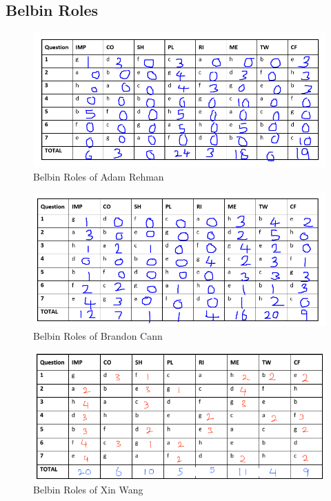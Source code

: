 \documentclass[12pt,a4paper]{article}
\begin{document}
\subsection{Belbin Roles}
\begin{figure} [h!]
	\centering
	\includegraphics[scale=0.5]{Adam.PNG}
	\caption{Belbin Roles of Adam Rehman}
\end{figure}
\begin{figure} [h!]
	\centering
	\includegraphics[scale=0.5]{Brandon.PNG}
	\caption{Belbin Roles of Brandon Cann}
\end{figure}
\begin{figure} [h!]
	\centering
	\includegraphics[scale=0.75]{Xin.PNG}
	\caption{Belbin Roles of Xin Wang}
\end{figure}
\pagebreak
\end{document}
